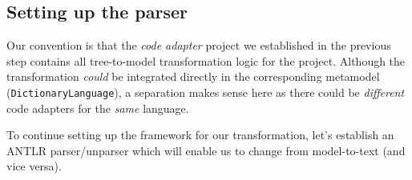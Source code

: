 \newpage
\hypertarget{subSec:setupParser}{}
\subsection{Setting up the parser}
\genHeader

Our convention is that the \emph{code adapter} project we established in the previous step contains all tree-to-model transformation logic for the project.
Although the transformation \emph{could} be integrated directly in the corresponding metamodel (\texttt{Dic\-tion\-ary\-Language}), a separation makes sense here as
there could be \emph{different} code adapters for the \emph{same} language. 

To continue setting up the framework for our transformation, let's establish an ANTLR parser/unparser which will enable us to change from model-to-text (and
vice versa).

